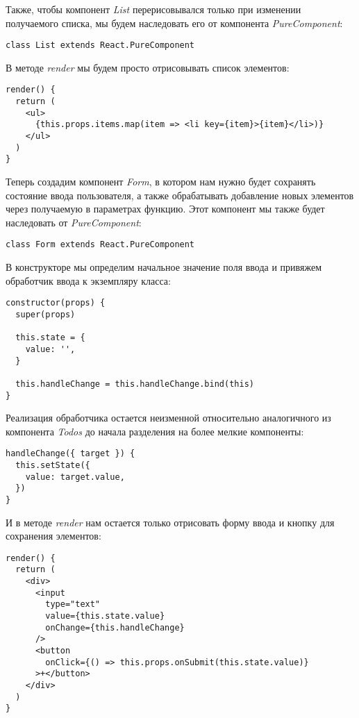 Также, чтобы компонент \textit{List} перерисовывался только при изменении получаемого списка, мы будем наследовать его от компонента \textit{PureComponent}:

\begin{lstlisting}
class List extends React.PureComponent
\end{lstlisting}

В методе \textit{render} мы будем просто отрисовывать список элементов:

\begin{lstlisting}
render() {
  return (
    <ul>
      {this.props.items.map(item => <li key={item}>{item}</li>)}
    </ul>
  )
}
\end{lstlisting}

Теперь создадим компонент \textit{Form}, в котором нам нужно будет сохранять состояние ввода пользователя, а также обрабатывать добавление новых элементов через получаемую в параметрах функцию. Этот компонент мы также будет наследовать от \textit{PureComponent}:

\begin{lstlisting}
class Form extends React.PureComponent
\end{lstlisting}

В конструкторе мы определим начальное значение поля ввода и привяжем обработчик ввода к экземпляру класса:

\begin{lstlisting}
constructor(props) {
  super(props)
  
  this.state = {
    value: '',
  }
  
  this.handleChange = this.handleChange.bind(this)
}
\end{lstlisting}

Реализация обработчика остается неизменной относительно аналогичного из компонента \textit{Todos} до начала разделения на более мелкие компоненты:

\begin{lstlisting}
handleChange({ target }) {
  this.setState({
    value: target.value,
  })
}
\end{lstlisting}

И в методе \textit{render} нам остается только отрисовать форму ввода и кнопку для сохранения элементов:

\begin{lstlisting}
render() {
  return (
    <div>
      <input
        type="text"
        value={this.state.value}
        onChange={this.handleChange}
      />
      <button
        onClick={() => this.props.onSubmit(this.state.value)}
      >+</button>
    </div>
  )
}
\end{lstlisting}

